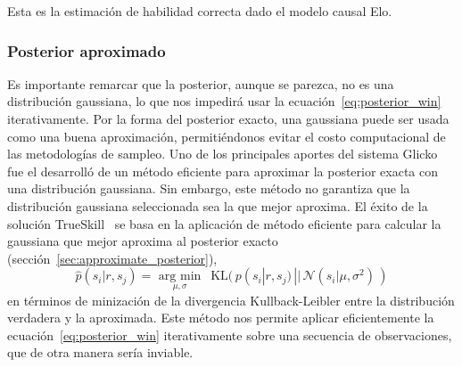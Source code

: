 \documentclass[a4paper,11pt]{book}
\newcommand{\N}{\mathcal{N}}
\theoremstyle{definition}
\begin{document}


Esta es la estimaci\'on de habilidad correcta dado el modelo causal Elo.

\subsubsection{Posterior aproximado}

Es importante remarcar que la posterior, aunque se parezca, no es una distribuci\'on gaussiana, lo que nos impedir\'a usar la ecuaci\'on~\eqref{eq:posterior_win} iterativamente.
%
Por la forma del posterior exacto, una gaussiana puede ser usada como una buena aproximaci\'on, permiti\'endonos evitar el costo computacional de las metodolog\'ias de sampleo.
%
Uno de los principales aportes del sistema Glicko~\cite{Glikman2013} fue el desarroll\'o de un m\'etodo eficiente para aproximar la posterior exacta con una distribuci\'on gaussiana.
%
Sin embargo, este m\'etodo no garantiza que la distribuci\'on gaussiana seleccionada sea la que mejor aproxima.
%
El \'exito de la soluci\'on TrueSkill~\cite{Herbrich2007} se basa en la aplicaci\'on de m\'etodo eficiente para calcular la gaussiana que mejor aproxima al posterior exacto (secci\'on~\ref{sec:approximate_posterior}),
%
\begin{equation} \label{eq:approx}
 \widehat{p}(s_i| r, s_j) = \underset{\mu, \sigma}{\text{ arg min }} \ \ \text{KL}(\, p(s_i| r, s_j) \, || \,  \N(s_i|\mu, \sigma^2) \, )
\end{equation}
%
en t\'erminos de minizaci\'on de la divergencia Kullback-Leibler entre la distribuci\'on verdadera y la aproximada.
%
Este m\'etodo nos permite aplicar eficientemente la ecuaci\'on~\eqref{eq:posterior_win} iterativamente sobre una secuencia de observaciones, que de otra manera ser\'ia inviable.

\end{document}
